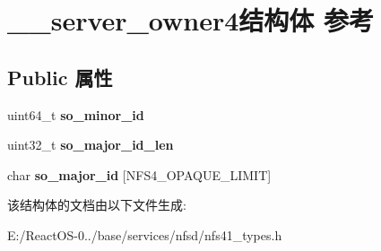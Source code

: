 \hypertarget{struct____server__owner4}{}\section{\+\_\+\+\_\+server\+\_\+owner4结构体 参考}
\label{struct____server__owner4}
\subsection*{Public 属性}
\begin{DoxyCompactItemize}
\item 
\mbox{\label{struct____server__owner4_a3ff3a6ed5708e0b9c6f5685936e44fcc}} 
uint64\+\_\+t {\bfseries so\+\_\+minor\+\_\+id}
\item 
\mbox{\label{struct____server__owner4_a9aa182812d16b6ecb4e7c00ee956d171}} 
uint32\+\_\+t {\bfseries so\+\_\+major\+\_\+id\+\_\+len}
\item 
\mbox{\label{struct____server__owner4_aa99069db97b60e6ddcf26404476d499f}} 
char {\bfseries so\+\_\+major\+\_\+id} \mbox{[}N\+F\+S4\+\_\+\+O\+P\+A\+Q\+U\+E\+\_\+\+L\+I\+M\+IT\mbox{]}
\end{DoxyCompactItemize}


该结构体的文档由以下文件生成\+:\begin{DoxyCompactItemize}
\item 
E\+:/\+React\+O\+S-\/0../base/services/nfsd/nfs41\+\_\+types.\+h\end{DoxyCompactItemize}
